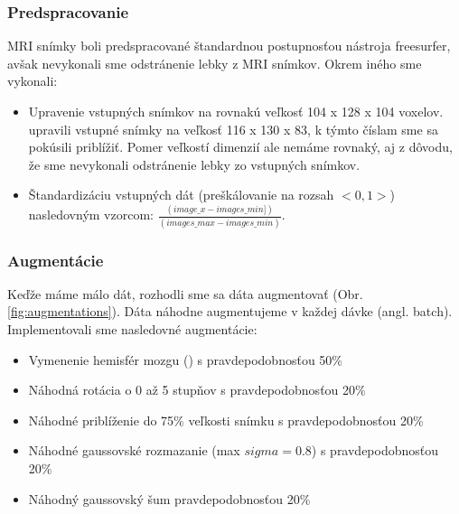 \subsubsection{Predspracovanie}

MRI snímky boli predspracované štandardnou postupnosťou nástroja freesurfer, avšak nevykonali sme odstránenie lebky z MRI snímkov.
Okrem iného sme vykonali:

\begin{itemize}
    \item Upravenie vstupných snímkov na rovnakú veľkosť 104 x 128 x 104 voxelov. \citeauthor*{esmaeilzadeh2018end} upravili vstupné snímky na veľkosť 116 x 130 x 83, k týmto číslam sme sa pokúsili priblížiť. Pomer veľkostí dimenzií ale nemáme rovnaký, aj z dôvodu, že sme nevykonali odstránenie lebky zo vstupných snímkov.
    \item Štandardizáciu vstupných dát (preškálovanie na rozsah $<0, 1>$) nasledovným vzorcom: $\frac{(image\_x - images\_min])}{(images\_max - images\_min)}$.
\end{itemize}

\subsubsection{Augmentácie}

Keďže máme málo dát, rozhodli sme sa dáta augmentovať (Obr. \ref{fig:augmentations}). Dáta náhodne augmentujeme v každej dávke (angl. batch). Implementovali sme nasledovné augmentácie:

\begin{itemize}
    \item Vymenenie hemisfér mozgu (\citeauthor*{esmaeilzadeh2018end}) s pravdepodobnosťou 50\%
    \item Náhodná rotácia o 0 až 5 stupňov s pravdepodobnosťou 20\%
    \item Náhodné priblíženie do 75\% veľkosti snímku s pravdepodobnosťou 20\%
    \item Náhodné gaussovské rozmazanie (max $sigma = 0.8$) s pravdepodobnosťou 20\%
    \item Náhodný gaussovský šum pravdepodobnosťou 20\%
\end{itemize}

